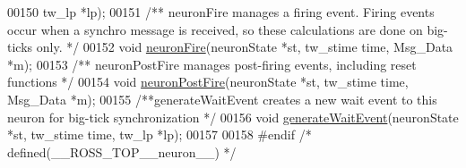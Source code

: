 \begin{DoxyCode}
00150                           tw\_lp *lp);
00151 \textcolor{comment}{/** neuronFire manages a firing event. Firing events occur when a synchro message is received, so
       these calculations are done on big-ticks only. */}
00152 \textcolor{keywordtype}{void} \hyperlink{neuron_8h_ae071ef984b7e0dd4ec38fca91e0abe39}{neuronFire}(neuronState *st, tw\_stime time, Msg\_Data *m);
00153 \textcolor{comment}{/** neuronPostFire manages post-firing events, including reset functions */}
00154 \textcolor{keywordtype}{void} \hyperlink{neuron_8h_ab1f4997e4bfe11e78faa6d37748aee67}{neuronPostFire}(neuronState *st, tw\_stime time, Msg\_Data *m);
00155 \textcolor{comment}{/**generateWaitEvent creates a new wait event to this neuron for big-tick synchronization */}
00156 \textcolor{keywordtype}{void} \hyperlink{neuron_8h_a06ee765bfae45fe9b7f0619bf4abe63d}{generateWaitEvent}(neuronState *st, tw\_stime time, tw\_lp *lp);
00157 
00158 \textcolor{preprocessor}{#}\textcolor{preprocessor}{endif} \textcolor{comment}{/* defined(\_\_ROSS\_TOP\_\_neuron\_\_) */}
\end{DoxyCode}
